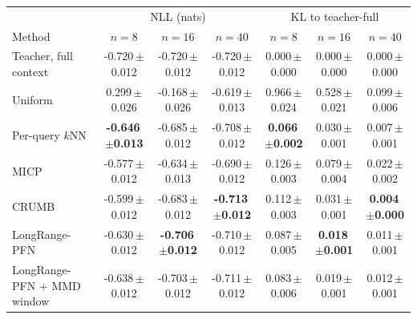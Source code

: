 \begin{tabular}{lcccccc}
\toprule
& \multicolumn{3}{c}{NLL (nats)} & \multicolumn{3}{c}{KL to teacher-full}\\
Method & $n=8$ & $n=16$ & $n=40$ & $n=8$ & $n=16$ & $n=40$\\
\midrule
Teacher, full context & -0.720\,{\scriptsize$\pm$0.012} & -0.720\,{\scriptsize$\pm$0.012} & -0.720\,{\scriptsize$\pm$0.012} & 0.000\,{\scriptsize$\pm$0.000} & 0.000\,{\scriptsize$\pm$0.000} & 0.000\,{\scriptsize$\pm$0.000}\\
Uniform & 0.299\,{\scriptsize$\pm$0.026} & -0.168\,{\scriptsize$\pm$0.026} & -0.619\,{\scriptsize$\pm$0.013} & 0.966\,{\scriptsize$\pm$0.024} & 0.528\,{\scriptsize$\pm$0.021} & 0.099\,{\scriptsize$\pm$0.006}\\
Per-query $k$NN & \textbf{-0.646\,{\scriptsize$\pm$0.013}} & -0.685\,{\scriptsize$\pm$0.012} & -0.708\,{\scriptsize$\pm$0.012} & \textbf{0.066\,{\scriptsize$\pm$0.002}} & 0.030\,{\scriptsize$\pm$0.001} & 0.007\,{\scriptsize$\pm$0.001}\\
MICP & -0.577\,{\scriptsize$\pm$0.012} & -0.634\,{\scriptsize$\pm$0.013} & -0.690\,{\scriptsize$\pm$0.012} & 0.126\,{\scriptsize$\pm$0.003} & 0.079\,{\scriptsize$\pm$0.004} & 0.022\,{\scriptsize$\pm$0.002}\\
CRUMB & -0.599\,{\scriptsize$\pm$0.012} & -0.683\,{\scriptsize$\pm$0.012} & \textbf{-0.713\,{\scriptsize$\pm$0.012}} & 0.112\,{\scriptsize$\pm$0.003} & 0.031\,{\scriptsize$\pm$0.001} & \textbf{0.004\,{\scriptsize$\pm$0.000}}\\
LongRange-PFN & -0.630\,{\scriptsize$\pm$0.012} & \textbf{-0.706\,{\scriptsize$\pm$0.012}} & -0.710\,{\scriptsize$\pm$0.012} & 0.087\,{\scriptsize$\pm$0.005} & \textbf{0.018\,{\scriptsize$\pm$0.001}} & 0.011\,{\scriptsize$\pm$0.001}\\
LongRange-PFN + MMD window & -0.638\,{\scriptsize$\pm$0.012} & -0.703\,{\scriptsize$\pm$0.012} & -0.711\,{\scriptsize$\pm$0.012} & 0.083\,{\scriptsize$\pm$0.006} & 0.019\,{\scriptsize$\pm$0.001} & 0.012\,{\scriptsize$\pm$0.001}\\
\bottomrule
\end{tabular}
